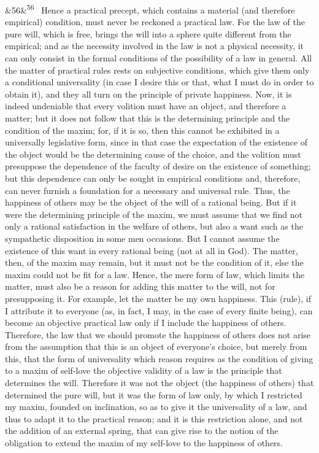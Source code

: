 \documentclass[12pt]{article}
\newcommand{\para}[1][]{\par\noindent\ifx&#1&\else\textsuperscript{\footnotesize #1}~\fi}
\begin{document}
\para[56] Hence a practical precept, which contains a material (and therefore empirical) condition, must never be reckoned a practical law. For the law of the pure will, which is free, brings the will into a sphere quite different from the empirical; and as the necessity involved in the law is not a physical necessity, it can only consist in the formal conditions of the possibility of a law in general. All the matter of practical rules rests on subjective conditions, which give them only a conditional universality (in case I desire this or that, what I must do in order to obtain it), and they all turn on the principle of private happiness. Now, it is indeed undeniable that every volition must have an object, and therefore a matter; but it does not follow that this is the determining principle and the condition of the maxim; for, if it is so, then this cannot be exhibited in a universally legislative form, since in that case the expectation of the existence of the object would be the determining cause of the choice, and the volition must presuppose the dependence of the faculty of desire on the existence of something; but this dependence can only be sought in empirical conditions and, therefore, can never furnish a foundation for a necessary and universal rule. Thus, the happiness of others may be the object of the will of a rational being. But if it were the determining principle of the maxim, we must assume that we find not only a rational satisfaction in the welfare of others, but also a want such as the sympathetic disposition in some men occasions. But I cannot assume the existence of this want in every rational being (not at all in God). The matter, then, of the maxim may remain, but it must not be the condition of it, else the maxim could not be fit for a law. Hence, the mere form of law, which limits the matter, must also be a reason for adding this matter to the will, not for presupposing it. For example, let the matter be my own happiness. This (rule), if I attribute it to everyone (as, in fact, I may, in the case of every finite being), can become an objective practical law only if I include the happiness of others. Therefore, the law that we should promote the happiness of others does not arise from the assumption that this is an object of everyone's choice, but merely from this, that the form of universality which reason requires as the condition of giving to a maxim of self-love the objective validity of a law is the principle that determines the will. Therefore it was not the object (the happiness of others) that determined the pure will, but it was the form of law only, by which I restricted my maxim, founded on inclination, so as to give it the universality of a law, and thus to adapt it to the practical reason; and it is this restriction alone, and not the addition of an external spring, that can give rise to the notion of the obligation to extend the maxim of my self-love to the happiness of others.
\end{document}

